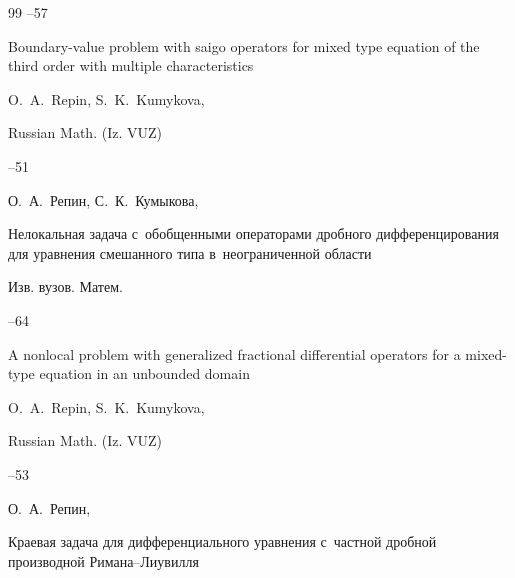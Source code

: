 \begin{thebibliography}{99}
--57


\transl

\paper Boundary-value problem with saigo operators for mixed type equation of the third order with multiple characteristics

\by O.~A.~Repin,  S.~K.~Kumykova,

\jour Russian Math. (Iz. VUZ)




--51






\by О.~А.~Репин, С.~К.~Кумыкова,

\paper Нелокальная задача с~обобщенными операторами дробного дифференцирования для уравнения смешанного типа в~неограниченной области

\jour Изв. вузов. Матем.



--64


\transl

\paper A nonlocal problem with generalized fractional differential operators for a mixed-type equation in an unbounded domain

\by O.~A.~Repin, S.~K.~Kumykova,

\jour Russian Math. (Iz. VUZ)




--53






\by О.~А.~Репин,

\paper Краевая задача для дифференциального уравнения с~частной дробной производной Римана--Лиувилля


\end{thebibliography}
